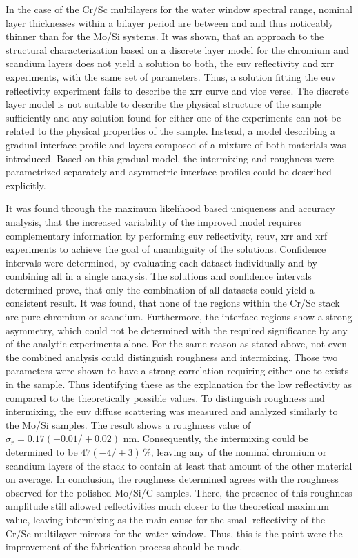 In the case of the Cr/Sc multilayers for the water window spectral range, nominal layer thicknesses within a bilayer period are between  and  and thus noticeably thinner than for the Mo/Si systems. It was shown, that an approach to the structural characterization based on a discrete layer model for the chromium and scandium layers does not yield a solution to both, the \gls{euv} reflectivity and \gls{xrr} experiments, with the same set of parameters. Thus, a solution fitting the \gls{euv} reflectivity experiment fails to describe the \gls{xrr} curve and vice verse. The discrete layer model is not suitable to describe the physical structure of the sample sufficiently and any solution found for either one of the experiments can not be related to the physical properties of the sample. Instead, a model describing a gradual interface profile and layers composed of a mixture of both materials was introduced. Based on this gradual model, the intermixing and roughness were parametrized separately and asymmetric interface profiles could be described explicitly.

It was found through the maximum likelihood based uniqueness and accuracy analysis, that the increased variability of the improved model requires complementary information by performing \gls{euv} reflectivity, \gls{reuv}, \gls{xrr} and \gls{xrf} experiments to achieve the goal of unambiguity of the solutions. Confidence intervals were determined, by evaluating each dataset individually and by combining all in a single analysis. The solutions and confidence intervals determined prove, that only the combination of all datasets could yield a consistent result. It was found, that none of the regions within the Cr/Sc stack are pure chromium or scandium. Furthermore, the interface regions show a strong asymmetry, which could not be determined with the required significance by any of the analytic experiments alone. For the same reason as stated above, not even the combined analysis could distinguish roughness and intermixing. Those two parameters were shown to have a strong correlation requiring either one to exists in the sample. Thus identifying these as the explanation for the low reflectivity as compared to the theoretically possible values. To distinguish roughness and intermixing, the \gls{euv} diffuse scattering was measured and analyzed similarly to the Mo/Si samples. The result shows a roughness value of $\sigma_r = 0.17  (-0.01/+0.02)$ nm. Consequently, the intermixing could be determined to be $47 (-4/+3)\, \%$, leaving any of the nominal chromium or scandium layers of the stack to contain at least that amount of the other material on average. In conclusion, the roughness determined agrees with the roughness observed for the polished Mo/Si/C samples. There, the presence of this roughness amplitude still allowed reflectivities much closer to the theoretical maximum value, leaving intermixing as the main cause for the small reflectivity of the Cr/Sc multilayer mirrors for the water window. Thus, this is the point were the improvement of the fabrication process should be made.

